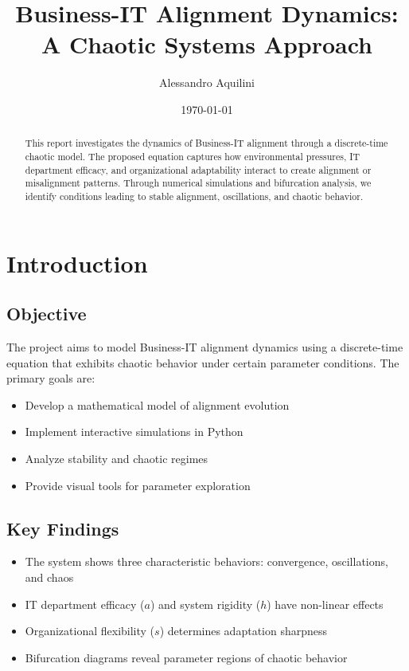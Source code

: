 \documentclass[a4paper, 12pt]{article}
\title{Business-IT Alignment Dynamics: A Chaotic Systems Approach}
\author{Alessandro Aquilini}
\date{\today}
\begin{document}
\pagestyle{empty}
\raggedright     %

\maketitle

\begin{abstract}
	This report investigates the dynamics of Business-IT alignment through a discrete-time chaotic model. The proposed equation captures how environmental pressures, IT department efficacy, and organizational adaptability interact to create alignment or misalignment patterns. Through numerical simulations and bifurcation analysis, we identify conditions leading to stable alignment, oscillations, and chaotic behavior.
\end{abstract}

\tableofcontents

\section{Introduction}
\subsection{Objective}
The project aims to model Business-IT alignment dynamics using a discrete-time equation that exhibits chaotic behavior under certain parameter conditions. The primary goals are:

\begin{itemize}
	\item Develop a mathematical model of alignment evolution
	\item Implement interactive simulations in Python
	\item Analyze stability and chaotic regimes
	\item Provide visual tools for parameter exploration
\end{itemize}

\subsection{Key Findings}
\begin{itemize}
	\item The system shows three characteristic behaviors: convergence, oscillations, and chaos
	\item IT department efficacy ($a$) and system rigidity ($h$) have non-linear effects
	\item Organizational flexibility ($s$) determines adaptation sharpness
	\item Bifurcation diagrams reveal parameter regions of chaotic behavior
\end{itemize}
\end{document}
